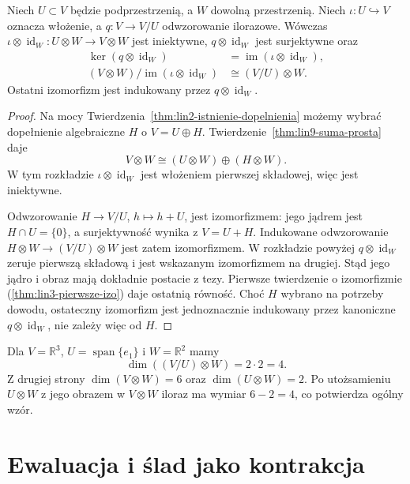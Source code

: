 \begin{twierdzenie}
\label{thm:lin9-iloraz}
Niech \(U\subset V\) będzie
podprzestrzenią, a \(W\)
dowolną przestrzenią.
Niech \(\iota\colon U\hookrightarrow V\)
oznacza włożenie,
a \(q\colon V\to V/U\)
odwzorowanie ilorazowe.
Wówczas
\(\iota\otimes\operatorname{id}_W
\colon U\otimes W\to V\otimes W\)
jest iniektywne,
\(q\otimes\operatorname{id}_W\)
jest surjektywne oraz
\[
 \begin{aligned}
 \ker(q\otimes\operatorname{id}_W)
 &=\operatorname{im}
      (\iota\otimes\operatorname{id}_W),\\
 (V\otimes W)/
 \operatorname{im}(\iota\otimes\operatorname{id}_W)
 &\cong(V/U)\otimes W.
 \end{aligned}
\]
Ostatni izomorfizm jest
indukowany przez
\(q\otimes\operatorname{id}_W\).
\end{twierdzenie}
\begin{proof}
Na mocy
Twierdzenia~\ref{thm:lin2-istnienie-dopelnienia}
możemy wybrać
dopełnienie algebraiczne \(H\)
o \(V=U\oplus H\).
Twierdzenie~\ref{thm:lin9-suma-prosta}
daje
\[
 V\otimes W\cong
 (U\otimes W)\oplus(H\otimes W).
\]
W tym rozkładzie
\(\iota\otimes\operatorname{id}_W\)
jest włożeniem pierwszej
składowej, więc jest iniektywne.

Odwzorowanie
\(H\to V/U\), \(h\mapsto h+U\),
jest izomorfizmem:
jego jądrem jest \(H\cap U=\{0\}\),
a surjektywność wynika
z \(V=U+H\).
Indukowane odwzorowanie
\(H\otimes W\to(V/U)\otimes W\)
jest zatem izomorfizmem.
W rozkładzie powyżej
\(q\otimes\operatorname{id}_W\)
zeruje pierwszą składową
i jest wskazanym izomorfizmem
na drugiej. Stąd jego
jądro i obraz mają dokładnie
postacie z tezy.
Pierwsze twierdzenie o izomorfizmie
(\ref{thm:lin3-pierwsze-izo})
daje ostatnią równość.
Choć \(H\) wybrano na potrzeby
dowodu, ostateczny izomorfizm
jest jednoznacznie indukowany
przez kanoniczne
\(q\otimes\operatorname{id}_W\),
nie zależy więc od \(H\).
\end{proof}

\begin{przyklad}
\label{prz:lin9-iloraz}
Dla \(V=\mathbb R^3\),
\(U=\operatorname{span}\{e_1\}\)
i \(W=\mathbb R^2\) mamy
\[
 \dim((V/U)\otimes W)=2\cdot2=4.
\]
Z drugiej strony
\(\dim(V\otimes W)=6\)
oraz \(\dim(U\otimes W)=2\).
Po utożsamieniu \(U\otimes W\)
z jego obrazem w \(V\otimes W\)
iloraz ma wymiar \(6-2=4\),
co potwierdza ogólny wzór.
\end{przyklad}

\section{Ewaluacja i ślad jako kontrakcja}
\label{sec:lin9-kontrakcja}

